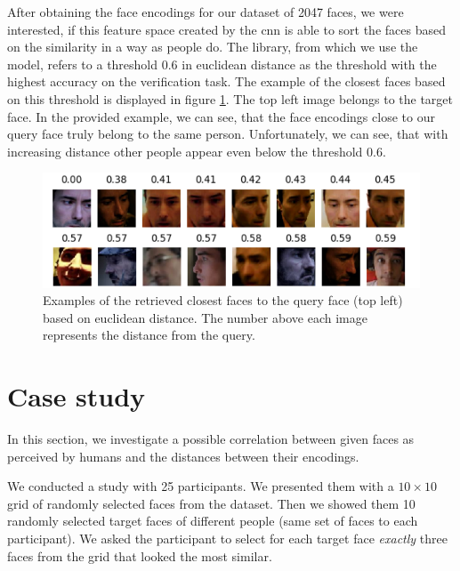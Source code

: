 After obtaining the face encodings for our dataset of 2047 faces, we were interested, if this feature space created by the \acrshort{cnn} is able to sort the faces based on the similarity in a way as people do. The library, from which we use the model, refers to a threshold 0.6 in euclidean distance as the threshold with the highest accuracy on the verification task. The example of the closest faces based on this threshold is displayed in  figure \ref{fig:closest_faces}. The top left image belongs to the target face. In the provided example, we can see, that the face encodings close to our query face truly belong to the same person. Unfortunately, we can see, that with increasing distance other people appear even below the threshold 0.6.


\begin{figure}
    \centering
    \includegraphics[width=\linewidth]{img/man_closest_faces.pdf}
    \caption{Examples of the retrieved closest faces to the query face (top left) based on euclidean distance. The number above each image represents the distance from the query.}
    \label{fig:closest_faces}
\end{figure}

\section{Case study}
\label{s:case_study}


In this section, we investigate a possible correlation between given faces as perceived by humans and the distances between their encodings.

We conducted a study with 25 participants. We presented them with a $10\times10$ grid of randomly selected faces from the dataset. 
Then we showed them 10 randomly selected target faces of different people (same set of faces to each participant). We asked the participant to select for each target face \emph{exactly} three faces from the grid that looked the most similar. 

